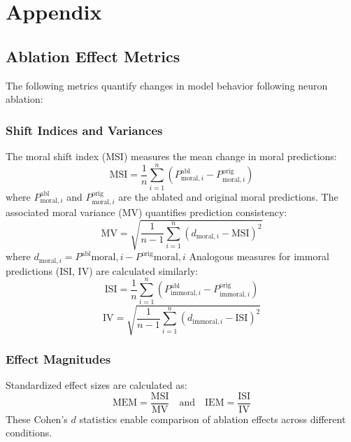 \documentclass[runninghheads]{llncs}
\begin{document}







\section*{Appendix}
\label{app:metrics}

\subsection*{Ablation Effect Metrics}
The following metrics quantify changes in model behavior following neuron ablation:

\subsubsection*{Shift Indices and Variances}
The moral shift index (MSI) measures the mean change in moral predictions:
$$
\text{MSI} = \frac{1}{n}\sum_{i=1}^{n}(P^{\text{abl}}_{\text{moral},i} - P^{\text{orig}}_{\text{moral},i})
$$
where $P^{\text{abl}}_{\text{moral},i}$ and $P^{\text{orig}}_{\text{moral},i}$ are the ablated and original moral predictions.
The associated moral variance (MV) quantifies prediction consistency:
$$\text{MV} = \sqrt{\frac{1}{n-1}\sum_{i=1}^{n}(d_{\text{moral},i} - \text{MSI})^2}$$
where $d_{\text{moral},i} = P^{\text{abl}}{\text{moral},i} - P^{\text{orig}}{\text{moral},i}$
Analogous measures for immoral predictions (ISI, IV) are calculated similarly:
$$
\text{ISI} = \frac{1}{n}\sum_{i=1}^{n}(P^{\text{abl}}_{\text{immoral},i} - P^{\text{orig}}_{\text{immoral},i})
$$
$$
\text{IV} = \sqrt{\frac{1}{n-1}\sum_{i=1}^{n}(d_{\text{immoral},i} - \text{ISI})^2}
$$

\subsubsection*{Effect Magnitudes}
Standardized effect sizes are calculated as:
$$
\text{MEM} = \frac{\text{MSI}}{\text{MV}} \quad \text{and} \quad \text{IEM} = \frac{\text{ISI}}{\text{IV}}
$$
These Cohen's $d$ statistics enable comparison of ablation effects across different conditions.
\end{document}
